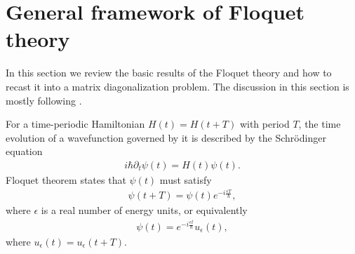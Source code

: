 \section{General framework of Floquet theory}\label{app:quantum-floquet-theory}

In this section we review the basic results of the Floquet theory and how to recast it into a matrix diagonalization problem. The discussion in this section is mostly following \cite{AEE}.

For a time-periodic Hamiltonian $H(t) = H(t+T)$ with period $T$, the time evolution of a wavefunction governed by it is described by the Schr\"{o}dinger equation
\begin{eqnarray}\label{eq:SchrHt}
	i\hbar \partial_t \psi(t) = H(t) \psi(t).
\end{eqnarray}
Floquet theorem states that $\psi(t)$ must satisfy
\begin{eqnarray}
	\psi(t+T) = \psi(t) e^{-i \frac{\epsilon T}{\hbar}},
\end{eqnarray}
where $\epsilon$ is a real number of energy units, or equivalently
\begin{eqnarray}
	\psi(t) = e^{-i \frac{\epsilon t}{\hbar}} u_{\epsilon}(t),
\end{eqnarray}
where $u_{\epsilon}(t) = u_{\epsilon}(t+T)$.

